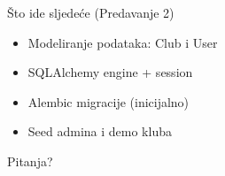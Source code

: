\begin{frame}{Što ide sljedeće (Predavanje 2)}
\begin{itemize}
  \item Modeliranje podataka: Club i User
  \item SQLAlchemy engine + session
  \item Alembic migracije (inicijalno)
  \item Seed admina i demo kluba
\end{itemize}

\vspace{0.8em}
\begin{center}
\Large Pitanja?
\end{center}
\end{frame}


